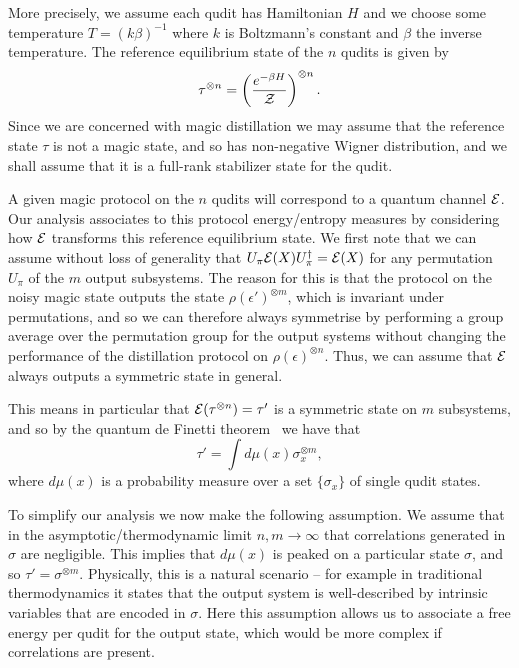 \documentclass[pra,
aps,
twocolumn,
superscriptaddress,
groupedaddress,
nofootinbib,
reprint
]{revtex4-1}
\begin{document}
More precisely, we assume each qudit has Hamiltonian $H$ and we choose some temperature $T = (k\beta)^{-1}$ where $k$ is Boltzmann's constant and $\beta$ the inverse temperature. The reference equilibrium state of the $n$ qudits is given by
\begin{equation}
\tau^{\otimes n} = \left ( \frac{e^{-\beta H}}{\mathcal{Z}} \right )  ^{\otimes n}.
\end{equation}
Since we are concerned with magic distillation we may assume that the reference state $\tau$ is not a magic state, and so has non-negative Wigner distribution, and we shall assume that it is a full-rank stabilizer state for the qudit. 

A given magic protocol on the $n$ qudits will correspond to a quantum channel $\mathcal{E}$. Our analysis associates to this protocol energy/entropy measures by considering how $\mathcal{E}$ transforms this reference equilibrium state. We first note that we can assume without loss of generality that $U_\pi\mathcal{E}(X) U_\pi^\dagger = \mathcal{E}(X)$ for any permutation $U_\pi$ of the $m$ output subsystems. The reason for this is that the protocol on the noisy magic state outputs the state $\rho(\epsilon')^{\otimes m}$, which is invariant under permutations, and so we can therefore always symmetrise by performing a group average over the permutation group for the output systems without changing the performance of the distillation protocol on $\rho(\epsilon)^{\otimes n}$. Thus, we can assume that $\mathcal{E}$ always outputs a symmetric state in general.

This means in particular that $\mathcal{E}(\tau^{\otimes n}) = \tau'$ is a symmetric state on $m$ subsystems, and so by the quantum de Finetti theorem~\cite{christandl_2007} we have that
\begin{equation}
\tau'  = \int d\mu(x) \sigma_x^{\otimes m},
\end{equation}
where $d\mu(x)$ is a probability measure over a set $\{\sigma_x\}$ of single qudit states.

To simplify our analysis we now make the following assumption. We assume that in the asymptotic/thermodynamic limit $n,m \rightarrow \infty$ that correlations generated in $\sigma$ are negligible. This implies that $d\mu(x)$ is peaked on a particular state $\sigma$, and so $\tau' = \sigma^{\otimes m}$. Physically, this is a natural scenario -- for example in traditional thermodynamics it states that the output system is well-described by intrinsic variables that are encoded in $\sigma$. Here this assumption allows us to associate a free energy per qudit for the output state, which would be more complex if correlations are present.
\end{document}
